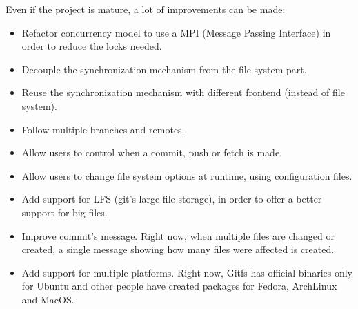 Even if the project is mature, a lot of improvements can be made:
\begin{itemize}
    \item Refactor concurrency model to use a MPI (Message Passing Interface) in order to reduce the locks needed.
    \item Decouple the synchronization mechanism from the file system part.
    \item Reuse the synchronization mechanism with different frontend (instead of file system).
    \item Follow multiple branches and remotes.
    \item Allow users to control when a commit, push or fetch is made.
    \item Allow users to change file system options at runtime, using configuration files.
    \item Add support for LFS (git's large file storage), in order to offer a better support for big files.
    \item Improve commit's message. Right now, when multiple files are changed or created, a single message showing how many files were affected is created.
    \item Add support for multiple platforms. Right now, Gitfs has official binaries only for Ubuntu and other people have created packages for Fedora, ArchLinux and MacOS.
\end{itemize}
    